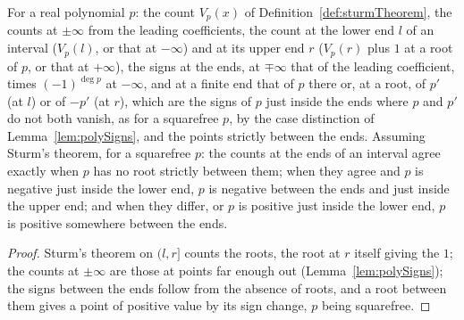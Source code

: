 \begin{lemma}\label{lem:sturmCounts}
  \leanok
  For a real polynomial $p$: the count $V_p(x)$ of Definition~\ref{def:sturmTheorem}, the counts at
  $\pm\infty$ from the leading coefficients, the count at the lower end $l$ of an interval
  ($V_p(l)$, or that at $-\infty$) and at its upper end $r$ ($V_p(r)$ plus $1$ at a root of $p$, or
  that at $+\infty$), the signs at the ends, at $\mp\infty$ that of the leading coefficient, times
  $(-1)^{\deg p}$ at $-\infty$, and at a finite end that of $p$ there or, at a root, of $p'$ (at
  $l$) or of $-p'$ (at $r$), which are the signs of $p$ just inside the ends where $p$ and $p'$ do
  not both vanish, as for a squarefree $p$, by the case distinction of Lemma~\ref{lem:polySigns},
  and the points strictly between the ends. Assuming Sturm's theorem, for a squarefree $p$: the
  counts at the ends of an interval agree exactly when $p$ has no root strictly between them; when
  they agree and $p$ is negative just inside the lower end, $p$ is negative between the ends and
  just inside the upper end; and when they differ, or $p$ is positive just inside the lower end, $p$
  is positive somewhere between the ends.
\end{lemma}

\begin{proof}\leanok
  Sturm's theorem on $(l, r]$ counts the roots, the root at $r$ itself giving the $1$; the counts at
  $\pm\infty$ are those at points far enough out (Lemma~\ref{lem:polySigns}); the signs between the
  ends follow from the absence of roots, and a root between them gives a point of positive value by
  its sign change, $p$ being squarefree.
\end{proof}

